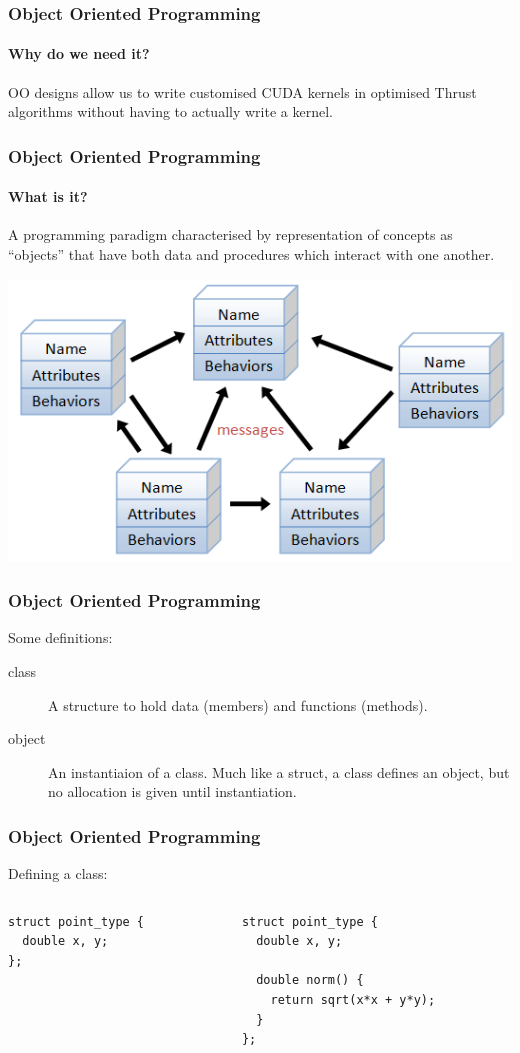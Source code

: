 \documentclass{beamer}
\begin{document}
\begin{frame}
  \frametitle{Object Oriented Programming}
  \framesubtitle{Why do we need it?}
  OO designs allow us to write customised CUDA kernels
  in optimised Thrust algorithms without having to
  actually write a kernel.
\end{frame}

\begin{frame}
  \frametitle{Object Oriented Programming}
  \framesubtitle{What is it?}
  A programming paradigm characterised by representation of concepts
  as ``objects'' that have both data and procedures which interact
  with one another.
  \begin{center}
    \includegraphics[width=.7\textwidth]{oop_objects.png}
  \end{center}
\end{frame}

\begin{frame}
  \frametitle{Object Oriented Programming}
  Some definitions:
  \begin{description}
    \item[class] A structure to hold data (members) and functions (methods).
    \item[object] An instantiaion of a class. Much like a struct, a class
      defines an object, but no allocation is given until instantiation.
  \end{description}
\end{frame}

\begin{frame}[fragile]
  \frametitle{Object Oriented Programming}
  Defining a class:
  \begin{example}
    \begin{columns}
      \begin{column}{.3\textwidth}
        \begin{lstlisting}
struct point_type {
  double x, y;
};
        \end{lstlisting}
      \end{column}
      \hspace{-10pt}
      \vrule{}
      \hspace{8pt}
      \begin{column}{.5\textwidth}
        \begin{lstlisting}
struct point_type {
  double x, y;

  double norm() {
    return sqrt(x*x + y*y);
  }
};
        \end{lstlisting}
      \end{column}
    \end{columns}
  \end{example}
\end{frame}
\end{document}
